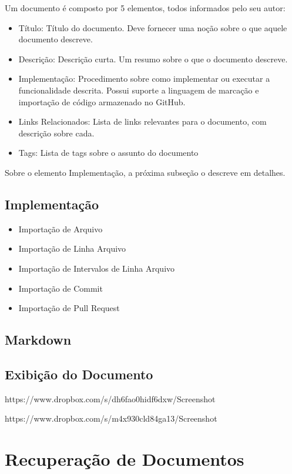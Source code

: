 Um documento é composto por 5 elementos, todos informados pelo seu autor:

\begin{itemize}
  \item Título: Título do documento. Deve fornecer uma noção sobre o que aquele documento descreve.
  \item Descrição: Descrição curta. Um resumo sobre o que o documento descreve.
  \item Implementação: Procedimento sobre como implementar ou executar a funcionalidade descrita. Possui suporte a linguagem de marcação e importação de código armazenado no GitHub.
  \item Links Relacionados: Lista de links relevantes para o documento, com descrição sobre cada.
  \item Tags: Lista de tags sobre o assunto do documento
\end{itemize}

Sobre o elemento Implementação, a próxima subseção o descreve em detalhes.

\subsection{Implementação}

\begin{itemize}
  \item Importação de Arquivo
  \item Importação de Linha Arquivo
  \item Importação de Intervalos de Linha Arquivo
  \item Importação de Commit
  \item Importação de Pull Request
\end{itemize}

\subsection{Markdown}
\subsection{Exibição do Documento}

https://www.dropbox.com/s/dh6fao0hidf6dxw/Screenshot%

https://www.dropbox.com/s/m4x930cld84ga13/Screenshot%

\section{Recuperação de Documentos}


